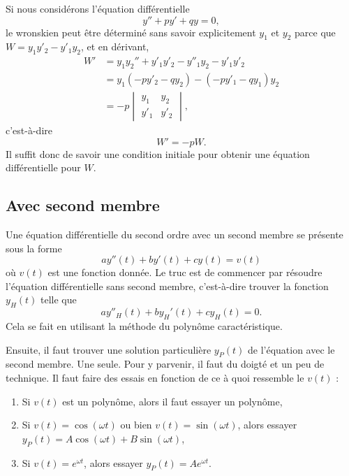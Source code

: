 Si nous considérons l'équation différentielle
\begin{equation}
	y''+py'+qy=0,
\end{equation}
le wronskien peut être déterminé sans savoir explicitement \( y_1\) et \( y_2\) parce que \( W=y_1y'_2-y'_1y_2\), et en dérivant,
\begin{subequations}
	\begin{align}
		W' & =y_1y_2''+y'_1y'_2-y''_1y_2-y'_1y'_2 \\
		   & =y_1(-py'_2-qy_2)-(-py'_1-qy_1)y_2   \\
		   & =-p\begin{vmatrix}
			        y_1  & y_2  \\
			        y'_1 & y'_2
		        \end{vmatrix},
	\end{align}
\end{subequations}
c'est-à-dire
\begin{equation}    \label{EqHEMRgM}
	W'=-pW.
\end{equation}
Il suffit donc de savoir une condition initiale pour obtenir une équation différentielle pour \( W\).

\subsection{Avec second membre}

Une équation différentielle du second ordre avec un second membre se présente sous la forme
\begin{equation}
	ay''(t)+by'(t)+cy(t)=v(t)
\end{equation}
où \( v(t)\) est une fonction donnée. Le truc est de commencer par résoudre l'équation différentielle sans second membre, c'est-à-dire trouver la fonction \( y_H(t)\) telle que
\begin{equation}
	ay''_H(t)+by_H'(t)+cy_H(t)=0.
\end{equation}
Cela se fait en utilisant la méthode du polynôme caractéristique.

Ensuite, il faut trouver une solution particulière \( y_P(t)\) de l'équation avec le second membre. Une seule. Pour y parvenir, il faut du doigté et un peu de technique. Il faut faire des essais en fonction de ce à quoi ressemble le \( v(t)\) :
\begin{enumerate}

	\item
	      Si \( v(t)\) est un polynôme, alors il faut essayer un polynôme,

	\item
	      Si \( v(t)=\cos(\omega t)\) ou bien \( v(t)=\sin(\omega t)\), alors essayer \( y_P(t)=A\cos(\omega t)+B\sin(\omega t)\),

	\item
	      Si \( v(t)= e^{\omega t}\), alors essayer \( y_P(t)=A e^{\omega t}\).

\end{enumerate}

